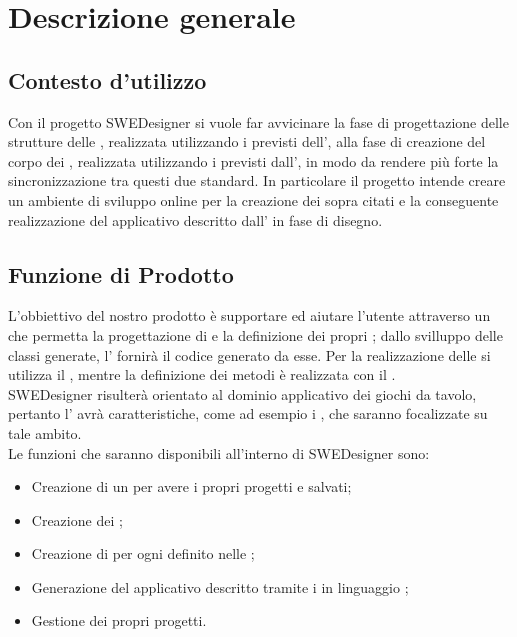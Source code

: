 \section{Descrizione generale}
\subsection{Contesto d'utilizzo}
Con il progetto SWEDesigner si vuole far avvicinare la fase di progettazione delle strutture delle , realizzata utilizzando i  previsti dell', alla fase di creazione del corpo dei , realizzata utilizzando i  previsti dall', in modo da  rendere più forte la sincronizzazione tra questi due standard. In particolare il progetto intende creare un ambiente di sviluppo online per la creazione dei  sopra citati e la conseguente realizzazione del  applicativo descritto dall' in fase di disegno.

\subsection{Funzione di Prodotto}
L'obbiettivo del nostro prodotto è supportare ed aiutare l'utente attraverso un  che permetta la progettazione di  e la definizione dei propri ; dallo svilluppo delle classi generate, l' fornirà il codice generato da esse.
Per la realizzazione delle  si utilizza il , mentre la definizione dei metodi è realizzata con il .\\ SWEDesigner risulterà orientato al dominio applicativo dei giochi da tavolo, pertanto l' avrà caratteristiche, come ad esempio i , che saranno focalizzate su tale ambito.\\
Le funzioni che saranno disponibili all'interno di SWEDesigner sono:
\begin{itemize}
\item Creazione di un  per avere i propri progetti e  salvati;
\item Creazione dei ;
\item Creazione di  per ogni  definito nelle ;
\item Generazione del  applicativo descritto tramite i  in linguaggio ;
\item Gestione dei propri progetti.
\end{itemize}

